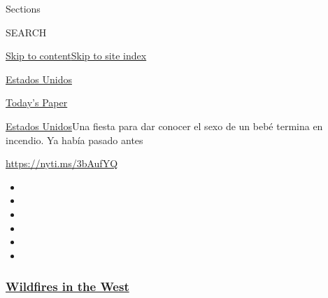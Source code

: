 Sections

SEARCH

\protect\hyperlink{site-content}{Skip to
content}\protect\hyperlink{site-index}{Skip to site index}

\href{https://www.nytimes3xbfgragh.onion/es/section/estados-unidos}{Estados
Unidos}

\href{https://myaccount.nytimes3xbfgragh.onion/auth/login?response_type=cookie\&client_id=vi}{}

\href{https://www.nytimes3xbfgragh.onion/section/todayspaper}{Today's
Paper}

\href{/es/section/estados-unidos}{Estados Unidos}\textbar{}Una fiesta
para dar conocer el sexo de un bebé termina en incendio. Ya había pasado
antes

\url{https://nyti.ms/3bAufYQ}

\begin{itemize}
\item
\item
\item
\item
\item
\item
\end{itemize}

\hypertarget{wildfires-in-the-west}{%
\subsubsection{\texorpdfstring{\href{https://www.nytimes3xbfgragh.onion/spotlight/california-wildfires?name=styln-california-wildfires\&region=TOP_BANNER\&block=storyline_menu_recirc\&action=click\&pgtype=Article\&impression_id=fae56380-f289-11ea-a60b-a756defe8488\&variant=undefined}{Wildfires
in the West}}{Wildfires in the West}}\label{wildfires-in-the-west}}

